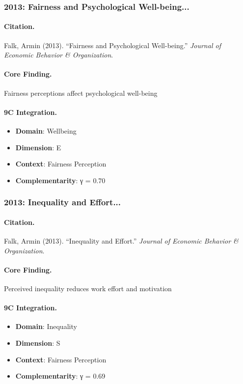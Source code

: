 \subsubsection{2013: Fairness and Psychological Well-being...}

\paragraph{Citation.}
Falk, Armin (2013). ``Fairness and Psychological Well-being.''
\textit{Journal of Economic Behavior & Organization}.

\paragraph{Core Finding.}
Fairness perceptions affect psychological well-being

\paragraph{9C Integration.}
\begin{itemize}[nosep]
  \item \textbf{Domain}: Wellbeing
  \item \textbf{Dimension}: E
  \item \textbf{Context}: Fairness Perception
  \item \textbf{Complementarity}: γ = 0.70
\end{itemize}


\subsubsection{2013: Inequality and Effort...}

\paragraph{Citation.}
Falk, Armin (2013). ``Inequality and Effort.''
\textit{Journal of Economic Behavior & Organization}.

\paragraph{Core Finding.}
Perceived inequality reduces work effort and motivation

\paragraph{9C Integration.}
\begin{itemize}[nosep]
  \item \textbf{Domain}: Inequality
  \item \textbf{Dimension}: S
  \item \textbf{Context}: Fairness Perception
  \item \textbf{Complementarity}: γ = 0.69
\end{itemize}


